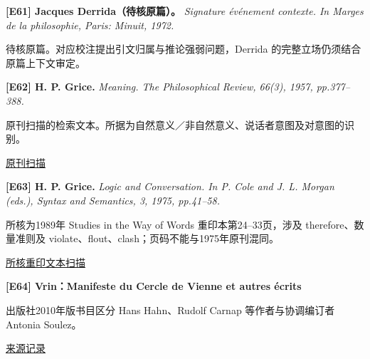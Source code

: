 \par\noindent\begin{minipage}{\linewidth}
\label{ref-61}\noindent\textbf{[E61] Jacques Derrida（待核原篇）。} \textit{Signature événement contexte. In Marges de la philosophie, Paris: Minuit, 1972.}\par\nobreak
待核原篇。对应校注提出引文归属与推论强弱问题，Derrida 的完整立场仍须结合原篇上下文审定。\par
\par\end{minipage}\par

\par\noindent\begin{minipage}{\linewidth}
\label{ref-62}\noindent\textbf{[E62] H. P. Grice.} \textit{Meaning. The Philosophical Review, 66(3), 1957, pp.377–388.}\par\nobreak
原刊扫描的检索文本。所据为自然意义／非自然意义、说话者意图及对意图的识别。\par
{\small\href{https://semantics.uchicago.edu/kennedy/classes/f09/semprag1/grice57.pdf}{原刊扫描}}\par
\par\end{minipage}\par

\par\noindent\begin{minipage}{\linewidth}
\label{ref-63}\noindent\textbf{[E63] H. P. Grice.} \textit{Logic and Conversation. In P. Cole and J. L. Morgan (eds.), Syntax and Semantics, 3, 1975, pp.41–58.}\par\nobreak
所核为1989年 Studies in the Way of Words 重印本第24–33页，涉及 therefore、数量准则及 violate、flout、clash；页码不能与1975年原刊混同。\par
{\small\href{https://semantics.uchicago.edu/kennedy/classes/f09/semprag1/grice75.pdf}{所核重印文本扫描}}\par
\par\end{minipage}\par

\par\noindent\begin{minipage}{\linewidth}
\label{ref-64}\noindent\textbf{[E64] Vrin：Manifeste du Cercle de Vienne et autres écrits}\par\nobreak
出版社2010年版书目区分 Hans Hahn、Rudolf Carnap 等作者与协调编订者 Antonia Soulez。\par
{\small\href{https://www.vrin.fr/livre/9782711622719/manifeste-du-cercle-de-vienne-et-autres-ecrits}{来源记录}}\par
\par\end{minipage}\par

